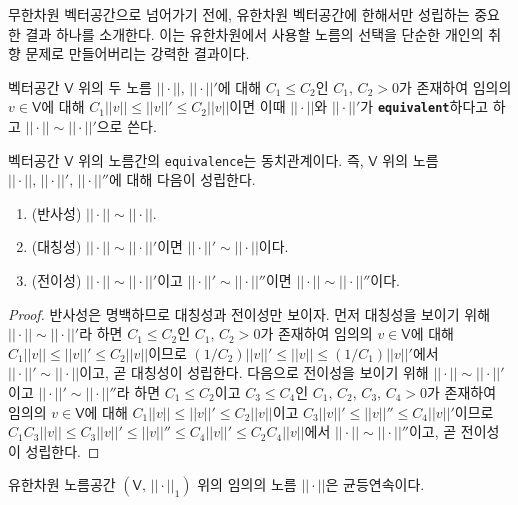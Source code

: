 무한차원 벡터공간으로 넘어가기 전에, 유한차원 벡터공간에 한해서만 성립하는 중요한 결과 하나를 소개한다. 이는 유한차원에서 사용할 노름의 선택을 단순한 개인의 취향 문제로 만들어버리는 강력한 결과이다.

\begin{definition}
    벡터공간 $\mathsf{V}$ 위의 두 노름 $||\cdot||,\,||\cdot||'$에 대해 $C_1\leq C_2$인 $C_1,\,C_2>0$가 존재하여 임의의 $v\in\mathsf{V}$에 대해 $C_1||v||\leq||v||'\leq C_2||v||$이면 이때 $||\cdot||$와 $||\cdot||'$가 \textbf{\texttt{equivalent}}하다고 하고 $||\cdot||\sim||\cdot||'$으로 쓴다. 
\end{definition}

\begin{proposition}\label{prop:normEquivalent}
    벡터공간 $\mathsf{V}$ 위의 노름간의 \texttt{equivalence}는 동치관계이다. 즉, $\mathsf{V}$ 위의 노름 $||\cdot||,\,||\cdot||',\,||\cdot||''$에 대해 다음이 성립한다.
    \begin{enumerate}
        \item (반사성) $||\cdot||\sim||\cdot||$.
        \item (대칭성) $||\cdot||\sim||\cdot||'$이면 $||\cdot||'\sim||\cdot||$이다.
        \item (전이성) $||\cdot||\sim||\cdot||'$이고 $||\cdot||'\sim||\cdot||''$이면 $||\cdot||\sim||\cdot||''$이다.
    \end{enumerate}
\end{proposition}

\begin{proof}
    반사성은 명백하므로 대칭성과 전이성만 보이자. 먼저 대칭성을 보이기 위해 $||\cdot||\sim||\cdot||'$라 하면 $C_1\leq C_2$인 $C_1,\,C_2>0$가 존재하여 임의의 $v\in\mathsf{V}$에 대해 $C_1||v||\leq||v||'\leq C_2||v||$이므로 $(1/C_2)||v||'\leq||v||\leq(1/C_1)||v||'$에서 $||\cdot||'\sim||\cdot||$이고, 곧 대칭성이 성립한다. 다음으로 전이성을 보이기 위해 $||\cdot||\sim||\cdot||'$이고 $||\cdot||'\sim||\cdot||''$라 하면 $C_1\leq C_2$이고 $C_3\leq C_4$인 $C_1,\,C_2,\,C_3,\,C_4>0$가 존재하여 임의의 $v\in\mathsf{V}$에 대해 $C_1||v||\leq||v||'\leq C_2||v||$이고 $C_3||v||'\leq||v||''\leq C_4||v||'$이므로 $C_1C_3||v||\leq C_3||v||'\leq||v||''\leq C_4||v||'\leq C_2C_4||v||$에서 $||\cdot||\sim||\cdot||''$이고, 곧 전이성이 성립한다.
\end{proof}

\begin{lemma}
    유한차원 노름공간 $(\mathsf{V},\,||\cdot||_1)$ 위의 임의의 노름 $||\cdot||$은 균등연속이다.
\end{lemma}

